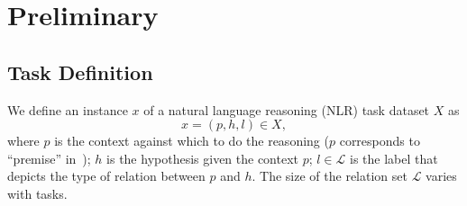 \section{Preliminary}
\label{sec:formulation}
\subsection{Task Definition}
We define an instance $x$ of a natural language reasoning (NLR) task 
dataset $X$ as
\begin{equation}
    x = (p, h, l) \in X, \label{eq:nli}
\end{equation}
\noindent
where $p$ is the context against which to do the reasoning ($p$ corresponds 
to ``premise'' in~);
$h$ is the hypothesis given the context $p$; 
$l \in \mathcal{L}$ is the label that 
depicts the type of relation between $p$ and $h$. 
The size of the relation set $\mathcal{L}$ varies with tasks. 



